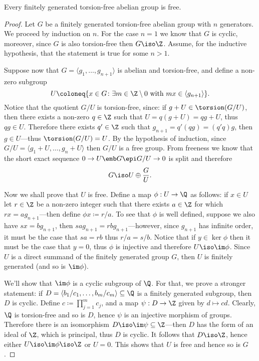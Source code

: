 \begin{theorem}
\label{thm:finitely-generated-torsion-free-abelian-grp-is-free}
Every finitely generated torsion-free abelian group is free.
\end{theorem}

\begin{proof}
Let \(G\) be a finitely generated torsion-free abelian group with \(n\)
generators. We proceed by induction on \(n\). For the case \(n = 1\) we know
that \(G\) is cyclic, moreover, since \(G\) is also torsion-free then
\(G \iso \Z\). Assume, for the inductive hypothesis, that the statement is true
for some \(n > 1\).

Suppose now that \(G = \langle g_1, \dots, g_{n+1} \rangle\) is abelian and
torsion-free, and define a non-zero subgroup
\[
U \coloneq
\{x \in G \colon \exists m \in \Z \setminus 0
\text{ with } m x \in \langle g_{n+1} \rangle\}.
\]
Notice that the quotient \(G/U\) is torsion-free, since: if
\(g + U \in \torsion(G/U)\), then there exists a non-zero \(q \in \Z\) such that
\(U = q(g + U) = q g + U\), thus \(q g \in U\). Therefore there exists
\(q' \in \Z\) such that \(g_{n+1} = q'(q g) = (q' q) g\), then
\(g \in U\)---thus \(\torsion(G/U) = U\). By the hypothesis of induction, since
\(G/U = \langle g_1 + U, \dots, g_n + U \rangle\) then \(G/U\) is a free
group. From freeness we know that the short exact sequence
\(0 \to U \emb G \epi G/U \to 0\) is split and therefore
\[
G \iso U \oplus \frac{G}{U}.
\]

Now we shall prove that \(U\) is free. Define a map \(\phi: U \to \Q\) as
follows: if \(x \in U\) let \(r \in \Z\) be a non-zero
integer such that there exists \(a \in \Z\) for which \(r x = a g_{n+1}\)---then
define \(\phi x \coloneq r/a\). To see that \(\phi\) is well defined, suppose we
also have \(s x = b g_{n + 1}\), then \(s a g_{n+1} = r b g_{n+1}\)---however,
since \(g_{n+1}\) has infinite order, it must be the case that \(s a = r b\)
thus \(r/a = s/b\). Notice that if \(y \in \ker \phi\) then it must be the case
that \(y = 0\), thus \(\phi\) is injective and therefore \(U \iso \im
\phi\). Since \(U\) is a direct summand of the finitely generated group \(G\),
then \(U\) is finitely generated (and so is \(\im \phi\)).

We'll show that \(\im \phi\) is a cyclic subgroup of \(\Q\). For that, we prove
a stronger statement: if
\(D = \langle b_1/c_1, \dots, b_m/c_m \rangle \subseteq \Q\) is a finitely
generated subgroup, then \(D\) is cyclic. Define
\(c \coloneq \prod_{j=1}^m c_j\), and a map \(\psi: D \to \Z\) given by
\(d \mapsto c d\). Clearly, \(\Q\) is torsion-free and so is \(D\), hence
\(\psi\) is an injective morphism of groups. Therefore there is an isomorphism
\(D \iso \im \psi \subseteq \Z\)---then \(D\) has the form of an ideal of
\(\Z\), which is principal, thus \(D\) is cyclic. It follows that \(D \iso \Z\),
hence either \(U \iso \im \phi \iso \Z\) or \(U = 0\). This shows that \(U\) is
free and hence so is \(G\).
\end{proof}


